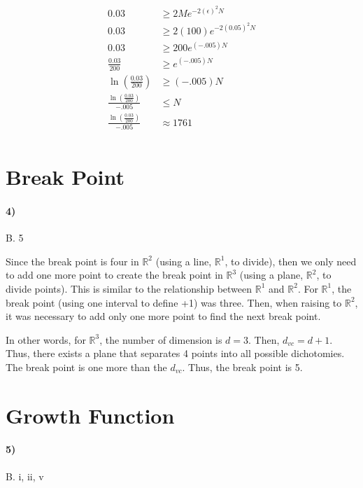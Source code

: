 \documentclass[10pt,letter]{article}
\begin{document}
	\begin{align*}
	0.03 &\geq 2 M e ^{-2(\epsilon)^2N} \\
	0.03 &\geq 2 (100) e ^{-2(0.05)^2N} \\
	0.03 &\geq 200 e ^{(-.005)N} \\
	\frac{0.03}{200} &\geq e ^{(-.005)N} \\
	\ln (\frac{0.03}{200}) &\geq (-.005)N \\
	\frac{\ln (\frac{0.03}{200})}{-.005} &\leq N \\
	\frac{\ln (\frac{0.03}{200})}{-.005} &\approx 1761 \\
	\end{align*}

\section*{Break Point}

\paragraph{4)} B. 5
	
	Since the break point is four in $\mathbb R^2$ (using a line, $\mathbb R^1$, to divide), then we only need to add one more point to create the break point in $\mathbb R^3$ (using a plane, $\mathbb R^2$, to divide points). This is similar to the relationship between $\mathbb R^1$ and $\mathbb R^2$. For $\mathbb R^1$, the break point (using one interval to define +1) was three. Then, when raising to $\mathbb R^2$, it was necessary to add only one more point to find the next break point.

	In other words, for $\mathbb R^3$, the number of dimension is $d = 3$. Then, $d_{vc} = d + 1$. Thus, there exists a plane that separates 4 points into all possible dichotomies. The break point is one more than the $d_{vc}$. Thus, the break point is 5.

\section*{Growth Function}

\paragraph{5)} B. i, ii, v
\end{document}
